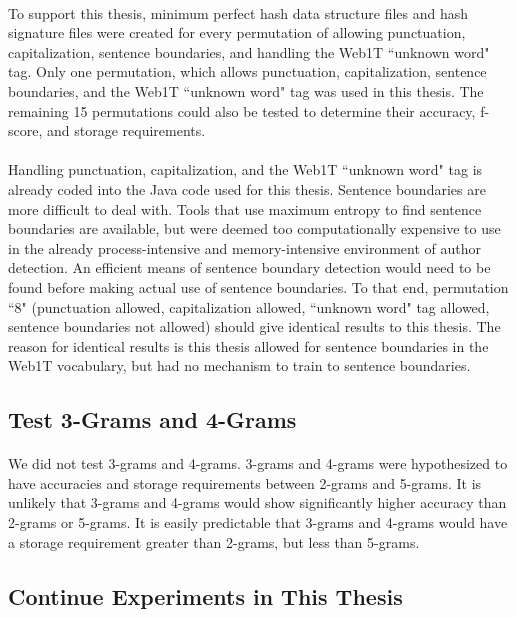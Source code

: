 		\paragraph*{} To support this thesis, minimum perfect hash data structure files and hash signature files were created for every permutation of allowing punctuation, capitalization, sentence boundaries, and handling the Web1T ``unknown word" tag.  Only one permutation, which allows punctuation, capitalization, sentence boundaries, and the Web1T ``unknown word" tag was used in this thesis.  The remaining 15 permutations could also be tested to determine their accuracy, f-score, and storage requirements.
		\paragraph*{} Handling punctuation, capitalization, and the Web1T ``unknown word" tag is already coded into the Java code used for this thesis.  Sentence boundaries are more difficult to deal with.  Tools that use maximum entropy to find sentence boundaries are available, but were deemed too computationally expensive to use in the already process-intensive and memory-intensive environment of author detection.  An efficient means of sentence boundary detection would need to be found before making actual use of sentence boundaries.  To that end, permutation ``8" (punctuation allowed, capitalization allowed, ``unknown word" tag allowed, sentence boundaries not allowed) should give identical results to this thesis. The reason for identical results is this thesis allowed for sentence boundaries in the Web1T vocabulary, but had no mechanism to train to sentence boundaries.

	\subsection{Test 3-Grams and 4-Grams}
	\paragraph*{}We did not test 3-grams and 4-grams.  3-grams and 4-grams were hypothesized to have accuracies and storage requirements between 2-grams and 5-grams.  It is unlikely that 3-grams and 4-grams would show significantly higher accuracy than 2-grams or 5-grams.  It is easily predictable that 3-grams and 4-grams would have a storage requirement greater than 2-grams, but less than 5-grams.

\begin{singlespace}
\section{Continue Experiments in This Thesis}
\end{singlespace}

